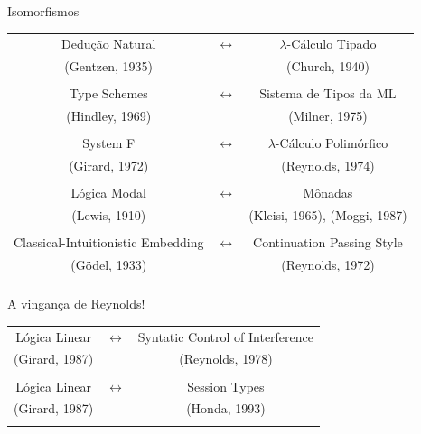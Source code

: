 \documentclass{beamer}
\begin{document}
\begin{frame}{Isomorfismos}

\begin{block}{}

\begin{center}
\begin{tabular}{ c c c }
\pause
 Dedução Natural & $\longleftrightarrow$ & $\lambda$-Cálculo Tipado \\ 
 (Gentzen, 1935) &  & (Church, 1940) \\  
                 &  &  \\
\pause 
 Type Schemes & $\longleftrightarrow$ & Sistema de Tipos da ML \\ 
 (Hindley, 1969) &  & (Milner, 1975) \\  
                 &  &  \\
\pause
 System F & $\longleftrightarrow$ & $\lambda$-Cálculo Polimórfico \\ 
 (Girard, 1972) &  & (Reynolds, 1974) \\  
                &  &  \\
\pause
 Lógica Modal & $\longleftrightarrow$ & Mônadas \\ 
 (Lewis, 1910) &  & (Kleisi, 1965), (Moggi, 1987) \\  
               &  &    \\
\pause
 Classical-Intuitionistic Embedding & $\longleftrightarrow$ & Continuation Passing Style \\ 
 (Gödel, 1933) &  & (Reynolds, 1972) \\  
               &  &   
\end{tabular}
\end{center}

\end{block}

\end{frame}


\begin{frame}{A vingança de Reynolds!}

\begin{block}{}

\begin{center}
\begin{tabular}{ c c c }
 Lógica Linear & $\longleftrightarrow$ & Syntatic Control of Interference \\ 
 (Girard, 1987) &  & (Reynolds, 1978) \\  
                 &  &  \\
 Lógica Linear & $\longleftrightarrow$ & Session Types \\ 
 (Girard, 1987) &  & (Honda, 1993) \\  
                 &  &      
\end{tabular}
\end{center}

\end{block}

\end{frame}
\end{document}

